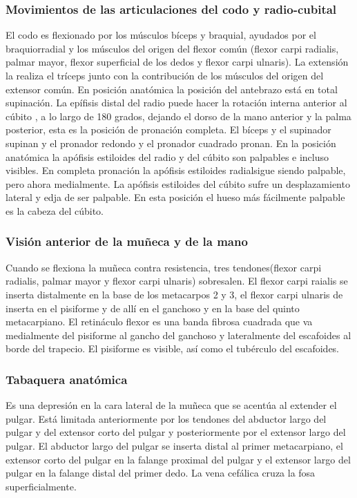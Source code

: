 \documentclass[a4paper,12pt]{article} %
\begin{document}
\begin{appendices}
\subsubsection{Movimientos de las articulaciones del codo y radio-cubital}
El codo es flexionado por los músculos bíceps y braquial, ayudados por el braquiorradial y los músculos del origen del flexor común (flexor carpi radialis, palmar mayor, flexor superficial de los dedos y flexor carpi ulnaris). La extensión la realiza el tríceps junto con la contribución de los músculos del origen del extensor común.
En posición anatómica la posición del antebrazo está en total supinación. La epífisis distal del radio puede hacer la rotación interna anterior al cúbito , a lo largo de 180 grados, dejando el dorso de la mano anterior y la palma posterior, esta es la posición de pronación completa. El bíceps y el supinador supinan y el pronador redondo y el pronador cuadrado pronan.
En la posición anatómica la apófisis estiloides del radio y del cúbito son palpables e incluso visibles. En completa pronación la apófisis estiloides radialsigue siendo palpable, pero ahora medialmente. La apófisis estiloides del cúbito sufre un desplazamiento lateral y edja de ser palpable. En esta posición el hueso más fácilmente palpable es la cabeza del cúbito.

\subsubsection{Visión anterior de la muñeca y de la mano}Cuando se flexiona la muñeca contra resistencia, tres tendones(flexor carpi radialis, palmar mayor y flexor carpi ulnaris) sobresalen. El flexor carpi raialis se inserta distalmente en la base de los metacarpos 2 y 3, el flexor carpi ulnaris de inserta en el pisiforme y de allí en el ganchoso y en la base del quinto metacarpiano.
El retináculo flexor es una banda fibrosa cuadrada que va medialmente del pisiforme al gancho del ganchoso y lateralmente del escafoides al borde del trapecio. El pisiforme es visible, así como el tubérculo del escafoides.

\subsubsection{Tabaquera anatómica}
Es una depresión en la cara lateral de la muñeca que se acentúa al extender el pulgar. Está limitada anteriormente por los tendones del abductor largo del pulgar y del extensor corto del pulgar y posteriormente por el extensor largo del pulgar. 
El abductor largo del pulgar se inserta distal al primer metacarpiano, el extensor corto del pulgar en la falange proximal del pulgar y el extensor largo del pulgar en la falange distal del primer dedo. La vena cefálica cruza la fosa superficialmente.


\end{appendices}
\end{document}
